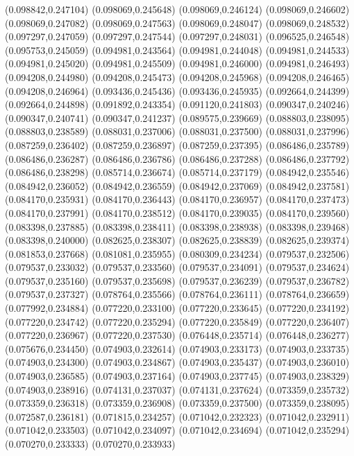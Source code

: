 (0.098842,0.247104)
(0.098069,0.245648)
(0.098069,0.246124)
(0.098069,0.246602)
(0.098069,0.247082)
(0.098069,0.247563)
(0.098069,0.248047)
(0.098069,0.248532)
(0.097297,0.247059)
(0.097297,0.247544)
(0.097297,0.248031)
(0.096525,0.246548)
(0.095753,0.245059)
(0.094981,0.243564)
(0.094981,0.244048)
(0.094981,0.244533)
(0.094981,0.245020)
(0.094981,0.245509)
(0.094981,0.246000)
(0.094981,0.246493)
(0.094208,0.244980)
(0.094208,0.245473)
(0.094208,0.245968)
(0.094208,0.246465)
(0.094208,0.246964)
(0.093436,0.245436)
(0.093436,0.245935)
(0.092664,0.244399)
(0.092664,0.244898)
(0.091892,0.243354)
(0.091120,0.241803)
(0.090347,0.240246)
(0.090347,0.240741)
(0.090347,0.241237)
(0.089575,0.239669)
(0.088803,0.238095)
(0.088803,0.238589)
(0.088031,0.237006)
(0.088031,0.237500)
(0.088031,0.237996)
(0.087259,0.236402)
(0.087259,0.236897)
(0.087259,0.237395)
(0.086486,0.235789)
(0.086486,0.236287)
(0.086486,0.236786)
(0.086486,0.237288)
(0.086486,0.237792)
(0.086486,0.238298)
(0.085714,0.236674)
(0.085714,0.237179)
(0.084942,0.235546)
(0.084942,0.236052)
(0.084942,0.236559)
(0.084942,0.237069)
(0.084942,0.237581)
(0.084170,0.235931)
(0.084170,0.236443)
(0.084170,0.236957)
(0.084170,0.237473)
(0.084170,0.237991)
(0.084170,0.238512)
(0.084170,0.239035)
(0.084170,0.239560)
(0.083398,0.237885)
(0.083398,0.238411)
(0.083398,0.238938)
(0.083398,0.239468)
(0.083398,0.240000)
(0.082625,0.238307)
(0.082625,0.238839)
(0.082625,0.239374)
(0.081853,0.237668)
(0.081081,0.235955)
(0.080309,0.234234)
(0.079537,0.232506)
(0.079537,0.233032)
(0.079537,0.233560)
(0.079537,0.234091)
(0.079537,0.234624)
(0.079537,0.235160)
(0.079537,0.235698)
(0.079537,0.236239)
(0.079537,0.236782)
(0.079537,0.237327)
(0.078764,0.235566)
(0.078764,0.236111)
(0.078764,0.236659)
(0.077992,0.234884)
(0.077220,0.233100)
(0.077220,0.233645)
(0.077220,0.234192)
(0.077220,0.234742)
(0.077220,0.235294)
(0.077220,0.235849)
(0.077220,0.236407)
(0.077220,0.236967)
(0.077220,0.237530)
(0.076448,0.235714)
(0.076448,0.236277)
(0.075676,0.234450)
(0.074903,0.232614)
(0.074903,0.233173)
(0.074903,0.233735)
(0.074903,0.234300)
(0.074903,0.234867)
(0.074903,0.235437)
(0.074903,0.236010)
(0.074903,0.236585)
(0.074903,0.237164)
(0.074903,0.237745)
(0.074903,0.238329)
(0.074903,0.238916)
(0.074131,0.237037)
(0.074131,0.237624)
(0.073359,0.235732)
(0.073359,0.236318)
(0.073359,0.236908)
(0.073359,0.237500)
(0.073359,0.238095)
(0.072587,0.236181)
(0.071815,0.234257)
(0.071042,0.232323)
(0.071042,0.232911)
(0.071042,0.233503)
(0.071042,0.234097)
(0.071042,0.234694)
(0.071042,0.235294)
(0.070270,0.233333)
(0.070270,0.233933)
